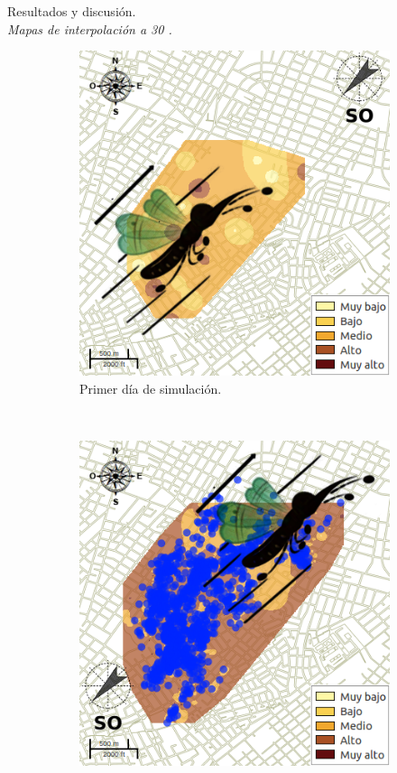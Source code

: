 \begin{frame}[t]{Resultados y discusión.\\\textit{Mapas de interpolación a 30 \textcelsius.}}
    \begin{figure}
    \begin{subfigure}[b]{0.45\textwidth}
        \includegraphics[width=\textwidth]{./graphics/raster-dispersion.png}
        \caption{Primer día de simulación.}
    \end{subfigure}
    ~~~~
    \begin{subfigure}[b]{0.45\textwidth}
        \includegraphics[width=\textwidth]{./graphics/raster-dispersion-final.png}

\end{subfigure}
\end{figure}
\end{frame}
